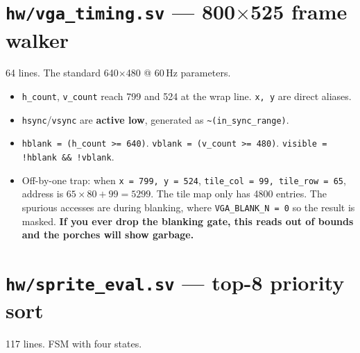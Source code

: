 \documentclass[11pt,letterpaper]{article}
\begin{document}
\section{\texttt{hw/vga\_timing.sv} --- 800$\times$525 frame walker}

64 lines. The standard 640$\times$480 @ 60\,Hz parameters.

\begin{itemize}[leftmargin=*,nosep]
  \item \texttt{h\_count}, \texttt{v\_count} reach 799 and 524 at the wrap
    line. \texttt{x, y} are direct aliases.
  \item \texttt{hsync}/\texttt{vsync} are \textbf{active low}, generated as
    \texttt{\textasciitilde(in\_sync\_range)}.
  \item \texttt{hblank = (h\_count >= 640)}.
    \texttt{vblank = (v\_count >= 480)}.
    \texttt{visible = !hblank \&\& !vblank}.
  \item Off-by-one trap: when \texttt{x = 799, y = 524},
    \texttt{tile\_col = 99, tile\_row = 65}, address is $65\times80 + 99
    = 5299$. The tile map only has 4800 entries. The spurious accesses are
    during blanking, where \texttt{VGA\_BLANK\_N = 0} so the result is
    masked. \textbf{If you ever drop the blanking gate, this reads out of
    bounds and the porches will show garbage.}
\end{itemize}

\section{\texttt{hw/sprite\_eval.sv} --- top-8 priority sort}

117 lines. FSM with four states.
\end{document}
